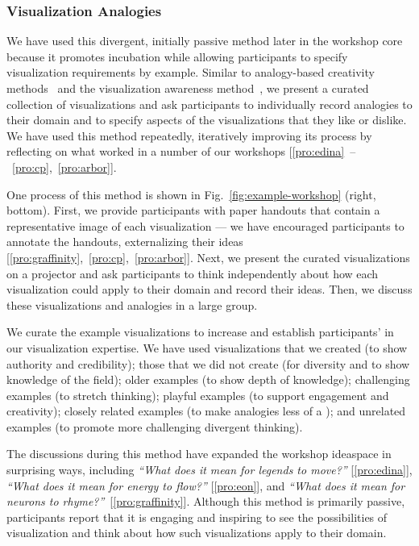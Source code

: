 \subsubsection*{Visualization Analogies} 

We have used this divergent, initially passive method later in the workshop core because it promotes incubation while allowing participants to specify visualization requirements by example.  Similar to analogy-based creativity methods~\cite{Gordon1961} and the visualization awareness method~\cite{Koh2011}, we present a curated collection of visualizations and ask participants to individually record analogies to their domain and to specify aspects of the visualizations that they like or dislike. We have used this method repeatedly, iteratively improving its process by reflecting on what worked in a number of our workshops [\ref{pro:edina}~--~\ref{pro:cp},~\ref{pro:arbor}]. 


One process of this method is shown in Fig.~\ref{fig:example-workshop} (right, bottom). First, we provide participants with paper handouts that contain a representative image of each visualization --- we have encouraged participants to annotate the handouts, externalizing their ideas [\ref{pro:graffinity},~\ref{pro:cp},~\ref{pro:arbor}]. Next, we present the curated visualizations on a projector and ask participants to think independently about how each visualization could apply to their domain and record their ideas. Then, we discuss these visualizations and analogies in a large group.

We curate the example visualizations to increase \interest and establish participants' \trust in our visualization expertise. We have used visualizations that we created (to show authority and credibility); those that we did not create (for diversity and to show knowledge of the field); older examples (to show depth of knowledge); challenging examples (to stretch thinking); playful examples (to support engagement and creativity); closely related examples (to make analogies less of a \challenge); and unrelated examples (to promote more challenging divergent thinking).

The discussions during this method have expanded the workshop ideaspace in surprising ways, including \emph{``What does it mean for legends to move?''} [\ref{pro:edina}], \emph{``What does it mean for energy to flow?''} [\ref{pro:eon}], and \emph{``What does it mean for neurons to rhyme?''}~[\ref{pro:graffinity}]. Although this method is primarily passive, participants report that it is engaging and inspiring to see the possibilities of visualization and think about how such visualizations apply to their domain.


